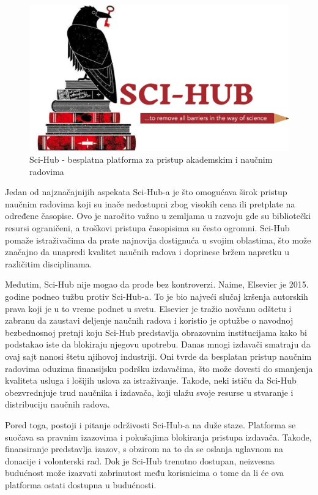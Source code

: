 \documentclass{article}
\begin{document}
\begin{figure}[h]
    \centering
    \includegraphics[width=0.75\linewidth]{img/sci-hub.png}
    \caption{Sci-Hub - besplatna platforma za pristup akademskim i naučnim radovima}
\end{figure}

Jedan od najznačajnijih aspekata Sci-Hub-a je što omogućava širok pristup naučnim radovima koji su inače nedostupni zbog visokih cena ili pretplate na određene časopise. Ovo je naročito važno u zemljama u razvoju gde su bibliotečki resursi ograničeni, a troškovi pristupa časopisima su često ogromni. Sci-Hub pomaže istraživačima da prate najnovija dostignuća u svojim oblastima, što može značajno da unapredi kvalitet naučnih radova i doprinese bržem napretku u različitim disciplinama.

Međutim, Sci-Hub nije mogao da prođe bez kontroverzi. Naime, Elsevier je 2015. godine podneo tužbu protiv Sci-Hub-a\cite{elseviersuing}. To je bio najveći slučaj kršenja autorskih prava koji je u to vreme podnet u svetu. Elsevier je tražio novčanu odštetu i zabranu da zaustavi deljenje naučnih radova i  koristio je optužbe o navodnoj bezbednosnoj pretnji koju Sci-Hub predstavlja obrazovnim institucijama kako bi podstakao iste da blokiraju njegovu upotrebu. Danas mnogi izdavači smatraju da ovaj sajt nanosi štetu njihovoj industriji. Oni tvrde da besplatan pristup naučnim radovima oduzima finansijsku podršku izdavačima, što može dovesti do smanjenja kvaliteta usluga i lošijih uslova za istraživanje. Takođe, neki ističu da Sci-Hub obezvrednjuje trud naučnika i izdavača, koji ulažu svoje resurse u stvaranje i distribuciju naučnih radova.

Pored toga, postoji i pitanje održivosti Sci-Hub-a na duže staze. Platforma se suočava sa pravnim izazovima i pokušajima blokiranja pristupa izdavača. Takođe, finansiranje predstavlja izazov, s obzirom na to da se oslanja uglavnom na donacije i volonterski rad. Dok je Sci-Hub trenutno dostupan, neizvesna budućnost može izazvati zabrinutost među korisnicima o tome da li će ova platforma ostati dostupna u budućnosti.
\end{document}
